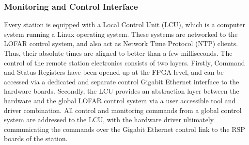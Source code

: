 \documentclass{ws-jai}
\begin{document}

\subsubsection {Monitoring and Control  Interface}
Every station is equipped  with a Local Control Unit (LCU),  which is a computer
system running  a Linux operating  system.  These  systems are networked  to the
LOFAR  control system,  and also  act as  Network Time  Protocol (NTP)  clients.
Thus, their  absolute times are aligned  to better than a  few milliseconds. The
control  of the  remote station  electronics  consists of  two layers.  Firstly,
Command and Status Registers  have been opened up at the FPGA  level, and can be
accessed via a dedicated and separate  control Gigabit Ethernet interface to the
hardware boards.  Secondly, the  LCU provides an  abstraction layer  between the
hardware and  the global  LOFAR control  system via a  user accessible  tool and
driver combination.  All  control and monitoring commands from  a global control
system  are  addressed   to  the  LCU,  with  the   hardware  driver  ultimately
communicating the  commands over the  Gigabit Ethernet  control link to  the RSP
boards of the station.


\end{document}
